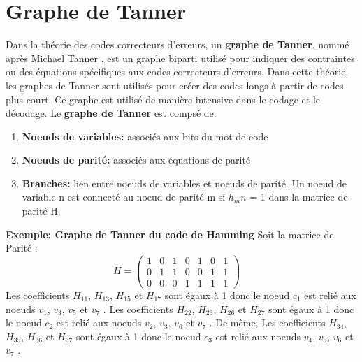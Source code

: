 \documentclass[french,nochapter,11pt]{rapportUB}
\begin{document}
\section{Graphe de Tanner}
Dans la théorie des codes correcteurs d'erreurs, un \textbf{graphe de Tanner}, nommé après Michael Tanner , est un graphe biparti utilisé pour 
indiquer des contraintes ou des équations spécifiques aux codes correcteurs d'erreurs. Dans cette théorie, les graphes de Tanner sont utilisés 
pour créer des codes longs à partir de codes plus court. Ce graphe est utilisé de manière intensive dans le codage et le décodage.\vspace{0.4cm}\newline
Le \textbf{graphe de Tanner} est compsé de:
\begin{enumerate}
  \item \textbf{Noeuds de variables:} associés aux bits du mot de code
  \item \textbf{Noeuds de parité:} associés aux équations de parité
  \item \textbf{Branches:} lien entre noeuds de variables et noeuds de parité. Un noeud de variable n est connecté au noeud de parité m si $h_mn$ = 1 dans la matrice de parité H.
\end{enumerate}
\vspace{0.4cm}
\textbf{Exemple: Graphe de Tanner du code de Hamming} \vspace{0.4cm}\newline
Soit la matrice de Parité : \newline
$$H=
\begin{pmatrix}
  1 & 0 & 1 & 0 & 1 & 0 & 1 \\
  0 & 1 & 1 & 0 & 0 & 1 & 1  \\
  
  0 & 0 & 0 & 1 & 1 & 1 & 1  
  
  
\end{pmatrix}
\quad
$$
\vspace{0.4cm}
Les coefficients $H_{11}$, $H_{13}$, $H_{15}$ et $H_{17}$ sont égaux à 1 donc le noeud $c_1$ est relié aux noeuds $v_1$, $v_3$, $v_5$ et $v_7$ . \newline
Les coefficients $H_{22}$, $H_{23}$, $H_{26}$ et $H_{27}$ sont égaux à 1 donc le noeud $c_2$ est relié aux noeuds $v_2$, $v_3$, $v_6$ et $v_7$ . \newline
De même, Les coefficients $H_{34}$, $H_{35}$, $H_{36}$ et $H_{37}$ sont égaux à 1 donc le noeud $c_3$ est relié aux noeuds $v_4$, $v_5$, $v_6$ et $v_7$ . \newline
\end{document}
